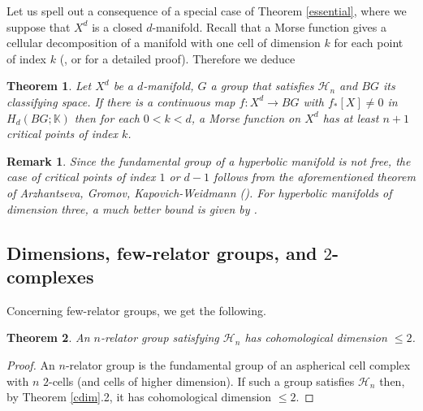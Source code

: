 \documentclass[11pt,letterpaper]{amsart}
\newtheorem{theorem}{Theorem}
\newtheorem*{remark}{Remark}
\begin{document}
Let us spell out a consequence of a special case of Theorem \ref{essential}, where we suppose that $X^d$ is a closed $d$-manifold.
Recall that a Morse function gives a cellular decomposition of a manifold with one cell of dimension $k$ for each point of index $k$ (\cite{thom}, or \cite{milnor} for a detailed proof). Therefore we deduce
{
\renewcommand{\thetheorem}{\ref{manifold}}
\begin{theorem}
Let $X^d$ be a $d$-manifold, $G$ a group that satisfies $\mathcal H_{n}$ and $BG$ its classifying space. If there is a continuous map $f:X^d\rightarrow BG$ with $f_*[X]\not=0$ in $H_d(BG;\mathbb K)$ then for each $0<k<d$, a Morse function on $X^d$ has at least $n+1$ critical points of index $k$.
\end{theorem}
\addtocounter{theorem}{-1}
}
\begin{remark}
Since the fundamental group of a hyperbolic manifold is not free, the case of critical points of index $1$ or $d-1$ follows from the aforementioned theorem of Arzhantseva, Gromov, Kapovich-Weidmann (\cite{arzhantseva,gromovexpanders,kapovichweidmann}). For hyperbolic manifolds of dimension three, a much better bound is given by \cite{bachman}.
\end{remark}

\subsection{Dimensions, few-relator groups, and $2$-complexes}
Concerning few-relator groups, we get the following.




{
\renewcommand{\thetheorem}{\ref{fewrelator}}
\begin{theorem}
An $n$-relator group satisfying $\mathcal{H}_{n}$ has cohomological dimension $\leq 2$.
\end{theorem}
\addtocounter{theorem}{-1}
}

\begin{proof}
An $n$-relator group is the fundamental group of an aspherical cell complex with $n$ $2$-cells (and cells of higher dimension). If such a group satisfies $\mathcal{H}_{n}$ then, by Theorem \ref{cdim}.2, it has cohomological dimension $\leq 2$.
\end{proof}
\end{document}
